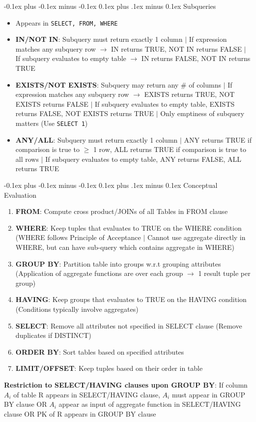 \documentclass[landscape]{article}
\makeatletter
\renewcommand{\subsection}{\@startsection{subsection}{2}{0mm}%
  {-0.1ex plus -0.1ex minus -0.1ex}%
  {0.1ex plus .1ex minus 0.1ex}%
{\normalfont\scriptsize\bfseries}}
\makeatother
\begin{document}
\begin{multicols*}{5}
    \subsection{Subqueries}
    \begin{itemize}
      \item Appears in \verb|SELECT, FROM, WHERE|
      \item \textbf{IN/NOT IN}: Subquery must return exactly 1 column $\vert$ If expression matches any subquery row $\rightarrow$ IN returns TRUE, NOT IN returns FALSE $\vert$ If subquery evaluates to empty table $\rightarrow$ IN returns FALSE, NOT IN returns TRUE
      \item \textbf{EXISTS/NOT EXISTS}: Subquery may return any \# of columns $\vert$ If expression matches any subquery row $\rightarrow$ EXISTS returns TRUE, NOT EXISTS returns FALSE $\vert$ If subquery evaluates to empty table, EXISTS returns FALSE, NOT EXISTS returns TRUE $\vert$ Only emptiness of subquery matters (Use \verb|SELECT 1|)
      \item \textbf{ANY/ALL}: Subquery must return exactly 1 column $\vert$ ANY returns TRUE if comparison is true to $\geq$ 1 row, ALL returns TRUE if comparison is true to all rows  $\vert$ If subquery evaluates to empty table, ANY returns FALSE, ALL returns TRUE
    \end{itemize}

    \subsection{Conceptual Evaluation}
    \begin{enumerate}
      \item \textbf{FROM}: Compute cross product/JOINs of all Tables in FROM clause
      \item \textbf{WHERE}: Keep tuples that evaluates to TRUE on the WHERE condition (WHERE follows Principle of Acceptance $\vert$ Cannot use aggregate directly in WHERE, but can have sub-query which contains aggregate in WHERE)
      \item \textbf{GROUP BY}: Partition table into groups w.r.t grouping attributes (Application of aggregate functions are over each group $\rightarrow$ 1 result tuple per group)
      \item \textbf{HAVING}: Keep groups that evaluates to TRUE on the HAVING condition (Conditions typically involve aggregates)
      \item \textbf{SELECT}: Remove all attributes not specified in SELECT clause (Remove duplicates if DISTINCT)
      \item \textbf{ORDER BY}: Sort tables based on specified attributes
      \item \textbf{LIMIT/OFFSET}: Keep tuples based on their order in table
    \end{enumerate}
    \textbf{Restriction to SELECT/HAVING clauses upon GROUP BY}: If column $A_i$ of table R appears in SELECT/HAVING clause, $A_i$ must appear in GROUP BY clause OR $A_i$ appear as input of aggregate function in SELECT/HAVING clause OR PK of R appears in GROUP BY clause


\end{multicols*}
\end{document}
